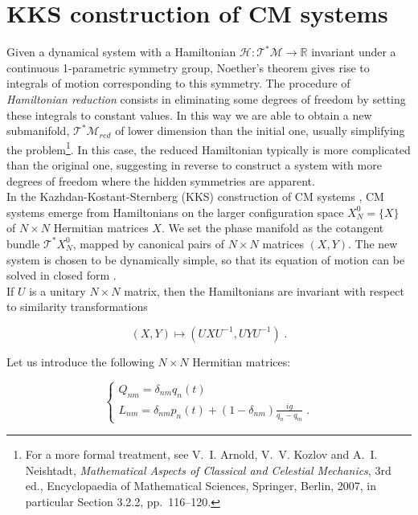 \section{KKS construction of CM systems}
Given a dynamical system with a Hamiltonian $\mathcal{H}:\mathcal{T}^\ast \mathcal{M} \to \mathbb{R}$ invariant under a continuous 1-parametric symmetry group, Noether’s theorem \cite{noether1918} gives rise to integrals of motion corresponding to this symmetry. The procedure of \textit{Hamiltonian reduction} consists in eliminating some degrees of freedom by setting these integrals to constant values. In this way we are able to obtain a new submanifold, $\mathcal{T}^\ast \mathcal{M}_{red}$ of lower dimension than the initial one, usually simplifying the problem\footnote{For a more formal treatment, see V.~I. Arnold, V.~V. Kozlov and A.~I. Neishtadt, \textit{Mathematical Aspects of Classical and Celestial Mechanics}, 3rd ed., Encyclopaedia of Mathematical Sciences, Springer, Berlin, 2007, in particular Section 3.2.2, pp.~116--120.}.
In this case, the reduced Hamiltonian typically is more complicated than the original one, suggesting in reverse to construct a system with more degrees of freedom where the hidden symmetries are apparent. \\
In the Kazhdan-Kostant-Sternberg (KKS) construction of CM systems \cite{KKS1978}, CM systems emerge from Hamiltonians on the larger configuration space $X^0_N = \{X\}$ of $N \times N$ Hermitian matrices $X$. We set the phase manifold as the cotangent bundle $\mathcal{T}^\ast X^0_N$, mapped by canonical pairs of $N \times N$ matrices $(X,Y)$. The new system is chosen to be dynamically simple, so that its equation of motion can be solved in closed form \cite{perelomov1989}. \\
If $U$ is a unitary $N \times N$ matrix, then the Hamiltonians are invariant with respect to similarity transformations

\begin{equation}
    (X, Y) \mapsto (UXU^{-1}, UYU^{-1})\;.
\end{equation}

Let us introduce the following $N \times N$ Hermitian matrices:

\begin{equation}
\begin{cases}
Q_{nm} = \delta_{nm} q_n(t) \\
L_{nm} = \delta_{nm}p_n(t) + (1 - \delta_{nm}) \frac{ig}{q_n - q_m}\;.
\end{cases}
\end{equation}

